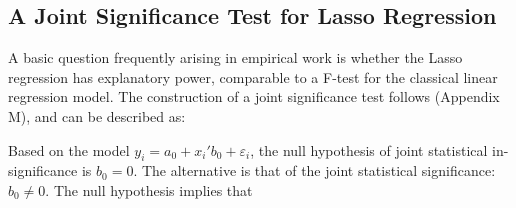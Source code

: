 \documentclass{amsart}\usepackage[]{graphicx}\usepackage[]{color}
\begin{document}
% 
% 


\subsection{A Joint Significance Test for Lasso Regression}

A basic question frequently arising in empirical work is whether the Lasso regression has explanatory power, comparable to a F-test for the classical linear regression model. The construction of a joint significance test follows \citep{CCK:AOS13} (Appendix M), and can be described as: 

Based on the model $ y_i =a_0 + x_i' b_0 + \varepsilon_i$, the null hypothesis of joint statistical in-significance is  $b_0 = 0$. The alternative is that of the joint statistical significance: $b_0 \neq 0$. The null hypothesis implies that
 
\end{document}
